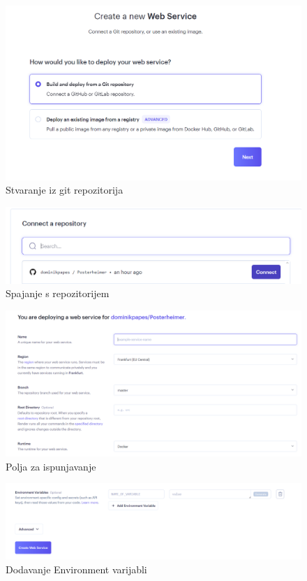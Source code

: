 			\newpage
			\begin{figure} [h]
				\includegraphics[width=\linewidth]{Slike/Stvaranje iz git repozitorija}
				\caption{Stvaranje iz git repozitorija}
			\end{figure}
			\newpage
			\begin{figure} [h]
				\includegraphics[width=\linewidth]{Slike/Spajanje s repozitorijem}
				\caption{Spajanje s repozitorijem}
			\end{figure}
			\newpage
			\begin{figure} [h]
				\includegraphics[width=\linewidth]{Slike/Polja za ispunjavanje}
				\caption{Polja za ispunjavanje}
			\end{figure}
			\newpage
			\begin{figure} [h]
				\includegraphics[width=\linewidth]{Slike/Dodavanje Environment varijabli}
				\caption{Dodavanje Environment varijabli}
			\end{figure}
